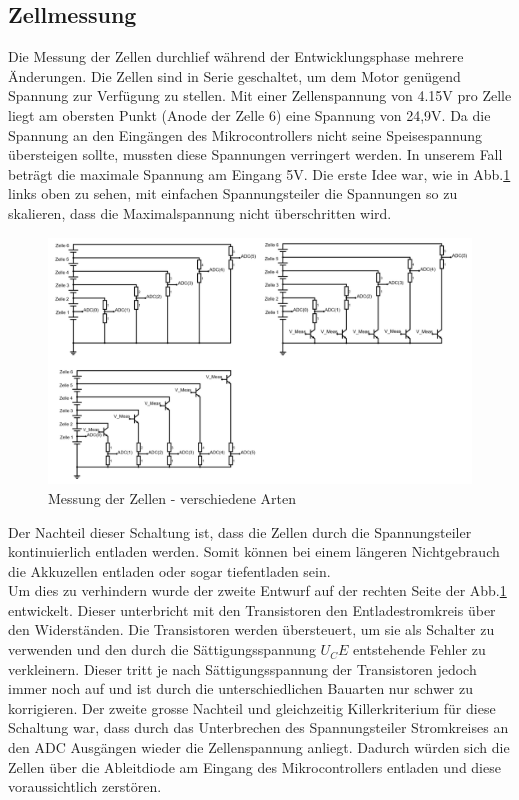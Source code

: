 \subsection*{Zellmessung}
Die Messung der Zellen durchlief während der Entwicklungsphase mehrere Änderungen. Die Zellen sind in Serie geschaltet, um dem Motor genügend Spannung zur Verfügung zu stellen. Mit einer Zellenspannung von 4.15V pro Zelle liegt am obersten Punkt (Anode der Zelle 6) eine Spannung von 24,9V. Da die Spannung an den Eingängen des Mikrocontrollers nicht seine Speisespannung übersteigen sollte, mussten diese Spannungen verringert werden. In unserem Fall beträgt die maximale Spannung am Eingang 5V. Die erste Idee war, wie in Abb.\ref{fig:zellmessung} links oben zu sehen, mit einfachen Spannungsteiler die Spannungen so zu skalieren, dass die Maximalspannung nicht überschritten wird. 
\begin{figure} [H]
	\centering
	\includegraphics[width=1\linewidth]{images/Zellmessung}
	\caption{Messung der Zellen - verschiedene Arten}
	\label{fig:zellmessung}
\end{figure}
Der Nachteil dieser Schaltung ist, dass die Zellen durch die Spannungsteiler kontinuierlich entladen werden. Somit können bei einem längeren Nichtgebrauch die Akkuzellen entladen oder sogar tiefentladen sein. \\
Um dies zu verhindern wurde der zweite Entwurf auf der rechten Seite der Abb.\ref{fig:zellmessung} entwickelt. Dieser unterbricht mit den Transistoren den Entladestromkreis über den Widerständen. Die Transistoren werden übersteuert, um sie als Schalter zu verwenden und den durch die Sättigungsspannung $U_CE$ entstehende Fehler zu verkleinern. Dieser tritt je nach Sättigungsspannung der Transistoren jedoch immer noch auf und ist durch die unterschiedlichen Bauarten nur schwer zu korrigieren. Der zweite grosse Nachteil und gleichzeitig Killerkriterium für diese Schaltung war, dass durch das Unterbrechen des Spannungsteiler Stromkreises an den ADC Ausgängen wieder die Zellenspannung anliegt. Dadurch würden sich die Zellen über die Ableitdiode am Eingang des Mikrocontrollers entladen und diese  voraussichtlich zerstören. \\
